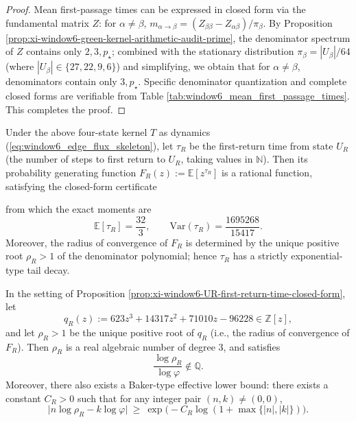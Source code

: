 \begin{proof}
Mean first-passage times can be expressed in closed form via the fundamental matrix \(Z\): for \(\alpha\neq\beta\),
\(
m_{\alpha\to\beta}=(Z_{\beta\beta}-Z_{\alpha\beta})/\pi_\beta
\).
By Proposition \ref{prop:xi-window6-green-kernel-arithmetic-audit-prime}, the denominator spectrum of \(Z\) contains only \(2,3,p_\star\);
combined with the stationary distribution \(\pi_\beta=|U_\beta|/64\) (where \(|U_\beta|\in\{27,22,9,6\}\)) and simplifying, we obtain that for \(\alpha\neq\beta\), denominators contain only \(3,p_\star\).
Specific denominator quantization and complete closed forms are verifiable from Table \ref{tab:window6_mean_first_passage_times}. This completes the proof.
\end{proof}





\begin{proposition}\label{prop:xi-window6-UR-first-return-time-closed-form}
Under the above four-state kernel \(T\) as dynamics (\eqref{eq:window6_edge_flux_skeleton}), let \(\tau_R\) be the first-return time from state \(U_R\) (the number of steps to first return to \(U_R\), taking values in \(\mathbb N\)).
Then its probability generating function \(F_R(z):=\mathbb E[z^{\tau_R}]\) is a rational function, satisfying the closed-form certificate

from which the exact moments are
\[
\mathbb E[\tau_R]=\frac{32}{3},
\qquad
\mathrm{Var}(\tau_R)=\frac{1695268}{15417}.
\]
Moreover, the radius of convergence of \(F_R\) is determined by the unique positive root \(\rho_R>1\) of the denominator polynomial; hence \(\tau_R\) has a strictly exponential-type tail decay.
\end{proposition}

\begin{corollary}\label{cor:xi-window6-logrhoR-logphi-irrational}
In the setting of Proposition \ref{prop:xi-window6-UR-first-return-time-closed-form}, let
\[
q_R(z):=623z^3+14317z^2+71010z-96228\in\mathbb Z[z],
\]
and let \(\rho_R>1\) be the unique positive root of \(q_R\) (i.e., the radius of convergence of \(F_R\)).
Then \(\rho_R\) is a real algebraic number of degree \(3\), and satisfies
\[
\frac{\log\rho_R}{\log\varphi}\notin\mathbb Q.
\]
Moreover, there also exists a Baker-type effective lower bound: there exists a constant \(C_R>0\) such that for any integer pair \((n,k)\neq(0,0)\),
\[
\bigl|n\log\rho_R-k\log\varphi\bigr|
\ \ge\
\exp\!\bigl(-C_R\log(1+\max\{|n|,|k|\})\bigr).
\]
\end{corollary}

